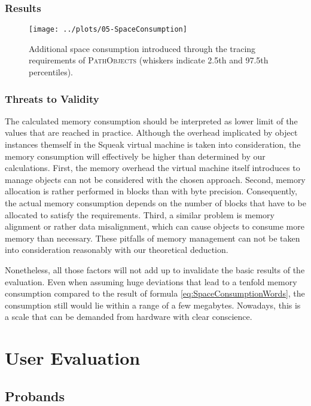 \subsubsection{Results}
\begin{figure}[h!]
	\centering
	\texttt{[image: ../plots/05-SpaceConsumption]}
	\caption[Space Requirements Introduced Through \textsc{PathObjects}]{Additional space consumption introduced through the tracing requirements of \textsc{PathObjects} (whiskers indicate 2.5th and 97.5th percentiles).}
	\label{f:DiscussionSpace}
\end{figure}

\subsubsection{Threats to Validity}
The calculated memory consumption should be interpreted as lower limit of the values that are reached in practice.
Although the overhead implicated by object instances themself in the Squeak virtual machine is taken into consideration, the memory consumption will effectively be higher than determined by our calculations.
First, the memory overhead the virtual machine itself introduces to manage objects can not be considered with the chosen approach.
Second, memory allocation is rather performed in blocks than with byte precision.
Consequently, the actual memory consumption depends on the number of blocks that have to be allocated to satisfy the requirements.
Third, a similar problem is memory alignment or rather data misalignment, which can cause objects to consume more memory than necessary.
These pitfalls of memory management can not be taken into consideration reasonably with our theoretical deduction.

Nonetheless, all those factors will not add up to invalidate the basic results of the evaluation.
Even when assuming huge deviations that lead to a tenfold memory consumption compared to the result of formula \ref{eq:SpaceConsumptionWords}, the consumption still would lie within a range of a few megabytes.
Nowadays, this is a scale that can be demanded from hardware with clear conscience.

\clearpage
\section{User Evaluation}
\label{s:DiscussionEvaluation}
\subsection{Probands}
